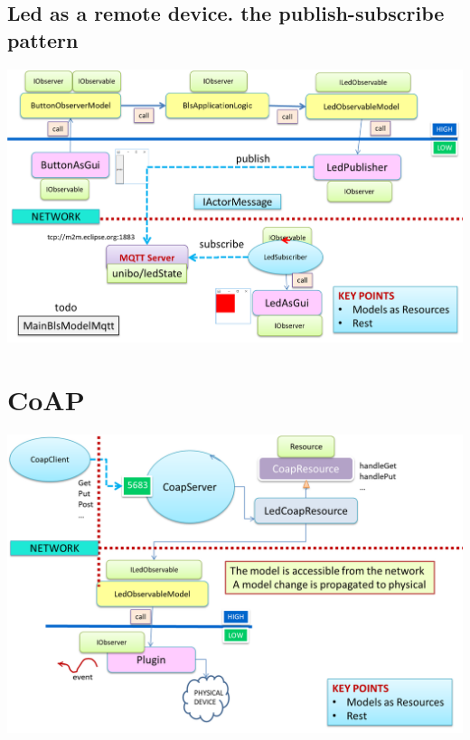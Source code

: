 \documentclass[10pt,a4paper,openright,twoside]{C:/Didattica/git/lab2014Bo/it.unibo.iss2015intro/docsInternal/contents/llncs}
\begin{document}

\subsection{Led as a remote device. the publish-subscribe pattern }

\medskip 
\includegraphics[scale = 0.5]{img/bls18/bls18ObjLedMqtt.png}


\newpage 
\section{CoAP}
 
\medskip 
\includegraphics[scale = 0.5]{img/bls18/bls18Coap0.png}
\end{document}
